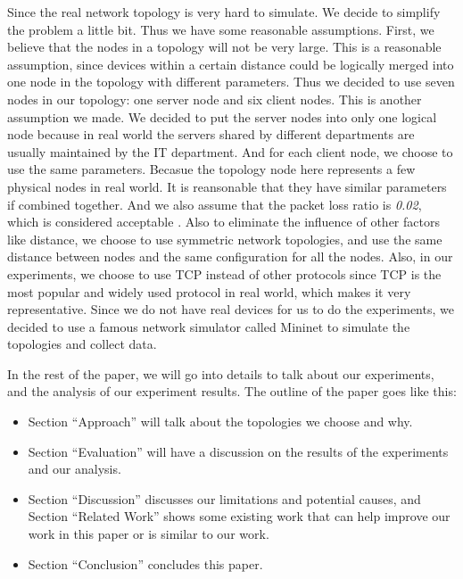 Since the real network topology is very hard to simulate. 
We decide to simplify the problem a little bit. Thus we have some reasonable assumptions.
First, we believe that the nodes in a topology will not be very large. 
This is a reasonable assumption, since devices within a certain distance 
could be logically merged into one node in the topology with different parameters. 
Thus we decided to use seven nodes in our topology: 
one server node and six client nodes. This is another assumption we made. 
We decided to put the server nodes into only one logical node 
because in real world the servers shared by different departments are usually 
maintained by the IT department. And for each client node, we choose to use the same parameters. 
Becasue the topology node here represents a few physical nodes in real world. It is reansonable 
that they have similar parameters if combined together.
And we also assume that the packet loss ratio is \textit{0.02}, which is considered 
acceptable \cite{PacketLoss:wiki}. 
Also to eliminate the influence of other factors like distance, 
we choose to use symmetric network topologies, 
and use the same distance between nodes and the same configuration for all the nodes.
Also, in our experiments, we choose to use TCP instead of other protocols since TCP is the most 
popular and widely used protocol in real world, which makes it very representative. Since we do not 
have real devices for us to do the experiments, we decided to use a famous network simulator called
Mininet \cite{Mininet:official} to simulate the topologies and collect data.

In the rest of the paper, we will go into details to talk about our experiments, and the analysis 
of our experiment results. The outline of the paper goes like this:
\begin{itemize}
    \item Section ``Approach'' will talk about the topologies we choose and why.
    \item Section ``Evaluation'' will have a discussion on the results of the experiments and our analysis.
	\item Section ``Discussion'' discusses our limitations and potential
	causes, and Section ``Related Work'' shows some existing work that 
	can help improve our work in this paper or is similar to our work.
    \item Section ``Conclusion'' concludes this paper.
\end{itemize}

